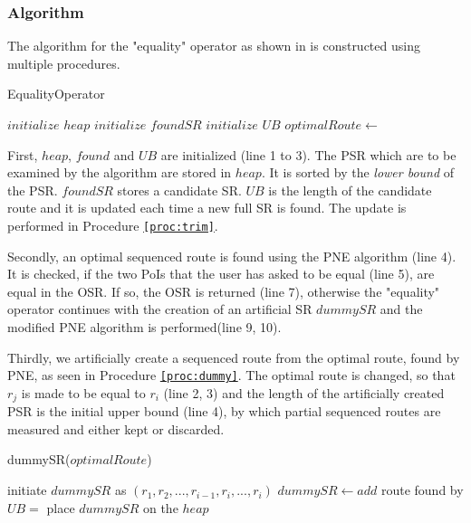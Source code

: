 \subsubsection{Algorithm}

The algorithm for the "equality" operator as shown in \texttt{} is constructed using multiple procedures.

\begin{algorithm}[htb!]
\caption{EqualityOperator}
\label{alg:equality}
	
	
	\BlankLine
	
	$initialize$ $heap$ 
	$initialize$ $foundSR$ 
	$initialize$ $UB$\; 
	$optimalRoute \leftarrow$\;
	{
		\;
		\modifiedPNE{}\;
	}

\end{algorithm}

First, $heap$, $found$ and $UB$ are initialized (line 1 to 3). The PSR which are to be examined by the algorithm are stored in $heap$. It is sorted by the \textit{lower bound} of the PSR. $foundSR$ stores a candidate SR. $UB$ is the length of the candidate route and it is updated each time a new full SR is found. The update is performed in Procedure \texttt{\ref{proc:trim}}.

Secondly, an optimal sequenced route is found using the PNE algorithm (line 4). It is checked, if the two PoIs that the user has asked to be equal (line 5), are equal in the OSR. If so, the OSR is returned (line 7), otherwise the "equality" operator continues with the creation of an artificial SR $dummySR$ and the modified PNE algorithm is performed(line 9, 10). 

Thirdly, we artificially create a sequenced route from the optimal route, found by PNE, as seen in Procedure \texttt{\ref{proc:dummy}}. The optimal route is changed, so that $r_j$ is made to be equal to $r_i$ (line 2, 3) and the length of the artificially created PSR is the initial upper bound (line 4), by which partial sequenced routes are measured and either kept or discarded.

\begin{procedure}[htb!]
\caption{dummySR($optimalRoute$)}
\label{proc:dummy}
	
	initiate $dummySR$ as $(r_1, r_2, ..., r_{i-1}, r_i, ..., r_i)$ 
	$dummySR \leftarrow add$ route found by \;
	$UB =$ \;
	place $dummySR$ on the $heap$\;
\end{procedure}

